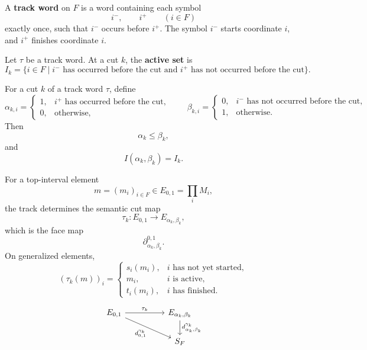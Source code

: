 \begin{definition}
\label{def:cmett-track-word}
    A \textbf{track word} on \(F\) is a word containing each symbol
    \[
        i^-,
        \qquad
        i^+
        \qquad
        (i\in F)
    \]
    exactly once, such that \(i^-\) occurs before \(i^+\). The symbol
    \(i^-\) starts coordinate \(i\), and \(i^+\) finishes coordinate \(i\).
\end{definition}

\begin{definition}
\label{def:cmett-active-set-cut}
    Let \(\tau\) be a track word. At a cut \(k\), the \textbf{active set} is
    \[
        I_k
        =
        \{i\in F\mid i^- \text{ has occurred before the cut and } i^+
        \text{ has not occurred before the cut}\}.
    \]
\end{definition}

For a cut \(k\) of a track word \(\tau\), define
\[
    \alpha_{k,i}
    =
    \begin{cases}
    1,& i^+ \text{ has occurred before the cut},\\
    0,& \text{otherwise},
    \end{cases}
    \qquad
    \beta_{k,i}
    =
    \begin{cases}
    0,& i^- \text{ has not occurred before the cut},\\
    1,& \text{otherwise}.
    \end{cases}
\]
Then
\[
    \alpha_k\leq\beta_k,
\]
and
\[
    I(\alpha_k,\beta_k)=I_k.
\]

For a top-interval element
\[
    m=(m_i)_{i\in F}\in E_{0,1}=\prod_iM_i,
\]
the track determines the semantic cut map
\[
    \tau_k:E_{0,1}\to E_{\alpha_k,\beta_k},
\]
which is the face map
\[
    \partial_{\alpha_k,\beta_k}^{0,1}.
\]
On generalized elements,
\[
    (\tau_k(m))_i
    =
    \begin{cases}
    s_i(m_i),& i\text{ has not yet started},\\
    m_i,& i\text{ is active},\\
    t_i(m_i),& i\text{ has finished}.
    \end{cases}
\]

\[
\begin{tikzcd}[column sep=huge]
E_{0,1}
    \arrow[r,"\tau_k"]
    \arrow[dr,"d_{0,1}^{\gamma_k}"']
&
E_{\alpha_k,\beta_k}
    \arrow[d,"d_{\alpha_k,\beta_k}^{\gamma_k}"]
\\
&
S_F
\end{tikzcd}
\]

